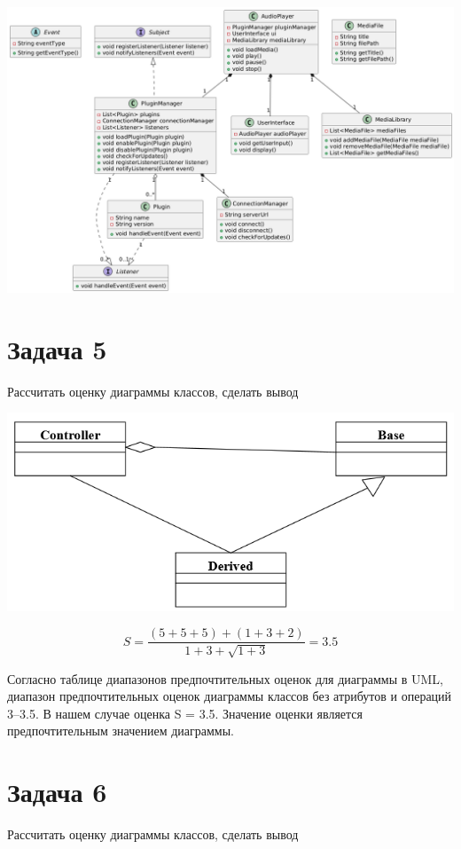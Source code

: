 \documentclass{article}
\begin{document}
\includegraphics[width=\textwidth]{4.png}

\section{Задача 5}
Рассчитать оценку диаграммы классов, сделать вывод


\includegraphics[width=\textwidth]{task5.png}

$$S = \frac{(5 + 5 + 5) + (1 + 3 + 2)}{1 + 3 + \sqrt{1 + 3}} = 3.5$$

Согласно таблице диапазонов предпочтительных оценок для диаграммы в UML, диапазон предпочтительных оценок диаграммы классов без атрибутов и операций 3–3.5. В нашем случае оценка S = 3.5. Значение оценки является предпочтительным значением диаграммы.

\section{Задача 6}
Рассчитать оценку диаграммы классов, сделать вывод
\end{document}

